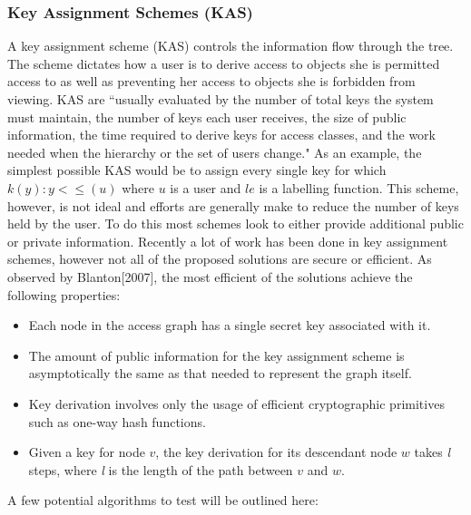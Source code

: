 \documentclass[12pt, titlepage]{article}
\begin{document}
\subsubsection{Key Assignment Schemes (KAS)}
A key assignment scheme (KAS) controls the information flow through the tree. The scheme dictates how a user is to derive access to objects she is permitted access to as well as preventing her access to objects she is forbidden from viewing. KAS are ``usually evaluated by the number of total keys the system must maintain, the number of keys each user receives, the size of public information, the time required to derive keys for access classes, and the work needed when the hierarchy or the set of users change.\cite{atallah2005}" As an example, the simplest possible KAS would be to assign every single key for which $k(y) : y<\le(u)$ where $u$ is a user and $le$ is a labelling function. This scheme, however, is not ideal and efforts are generally make to reduce the number of keys held by the user. To do this most schemes look to either provide additional public or private information. 
\newline \indent Recently a lot of work has been done in key assignment schemes, however not all of the proposed solutions are secure or efficient. As observed by Blanton[2007], the most efficient of the solutions achieve the following properties\cite{blanton2007}:
\begin{itemize}
\item Each node in the access graph has a single secret key associated with it.
\item The amount of public information for the key assignment scheme is asymptotically the same as that needed to represent the graph itself.
\item Key derivation involves only the usage of efficient cryptographic primitives such
as one-way hash functions.
\item Given a key for node $v$, the key derivation for its descendant node $w$ takes \textit{l} steps, where \textit{l} is the length of the path between $v$ and $w$.
\end{itemize}
 A few potential algorithms to test will be outlined here:
\end{document}
